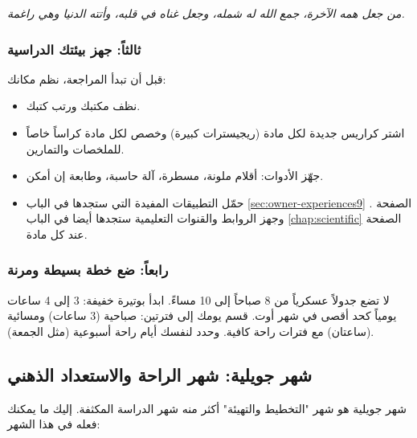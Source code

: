 \documentclass[12pt,a4paper]{book}
\newcommand{\quoteAr}[1]{%
	\begin{myquote}
		\itshape #1
	\end{myquote}
}
\begin{document}
	\quoteAr{من جعل همه الآخرة، جمع الله له شمله، وجعل غناه في قلبه، وأتته الدنيا وهي راغمة.}
	
	\subsubsection{ثالثاً: جهز بيئتك الدراسية}
	قبل أن تبدأ المراجعة، نظم مكانك:
	\begin{itemize}
		\item نظف مكتبك ورتب كتبك.
		\item اشتر كراريس جديدة لكل مادة (ريجيسترات كبيرة) وخصص لكل مادة كراساً خاصاً للملخصات والتمارين.
		\item جهّز الأدوات: أقلام ملونة، مسطرة، آلة حاسبة، وطابعة إن أمكن.
		\item حمّل التطبيقات المفيدة التي ستجدها في الباب \ref{sec:owner-experiences9} الصفحة \pageref{sec:owner-experiences9}. وجهز الروابط والقنوات التعليمية ستجدها أيضا في الباب  \ref{chap:scientific} الصفحة \pageref{chap:scientific} عند كل مادة.
	\end{itemize}

	\subsubsection{رابعاً: ضع خطة بسيطة ومرنة}
	لا تضع جدولاً عسكرياً من 8 صباحاً إلى 10 مساءً. ابدأ بوتيرة خفيفة: 3 إلى 4 ساعات يومياً كحد أقصى في شهر أوت. قسم يومك إلى فترتين: صباحية (3 ساعات) ومسائية (ساعتان) مع فترات راحة كافية. وحدد لنفسك أيام راحة أسبوعية (مثل الجمعة).
	
	\subsection{شهر جويلية: شهر الراحة والاستعداد الذهني}
	
	شهر جويلية هو شهر "التخطيط والتهيئة" أكثر منه شهر الدراسة المكثفة. إليك ما يمكنك فعله في هذا الشهر:
	
\end{document}
